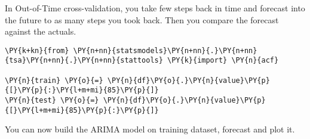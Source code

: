 In Out-of-Time cross-validation, you take few steps back in time and
forecast into the future to as many steps you took back. Then you
compare the forecast against the actuals.


\begin{tcolorbox}[breakable, size=fbox, boxrule=1pt, pad at break*=1mm,colback=cellbackground, colframe=cellborder]
\begin{Verbatim}[commandchars=\\\{\}]
\PY{k+kn}{from} \PY{n+nn}{statsmodels}\PY{n+nn}{.}\PY{n+nn}{tsa}\PY{n+nn}{.}\PY{n+nn}{stattools} \PY{k}{import} \PY{n}{acf}

\PY{n}{train} \PY{o}{=} \PY{n}{df}\PY{o}{.}\PY{n}{value}\PY{p}{[}\PY{p}{:}\PY{l+m+mi}{85}\PY{p}{]}
\PY{n}{test} \PY{o}{=} \PY{n}{df}\PY{o}{.}\PY{n}{value}\PY{p}{[}\PY{l+m+mi}{85}\PY{p}{:}\PY{p}{]}
\end{Verbatim}
\end{tcolorbox}

You can now build the ARIMA model on training dataset, forecast and plot
it.

